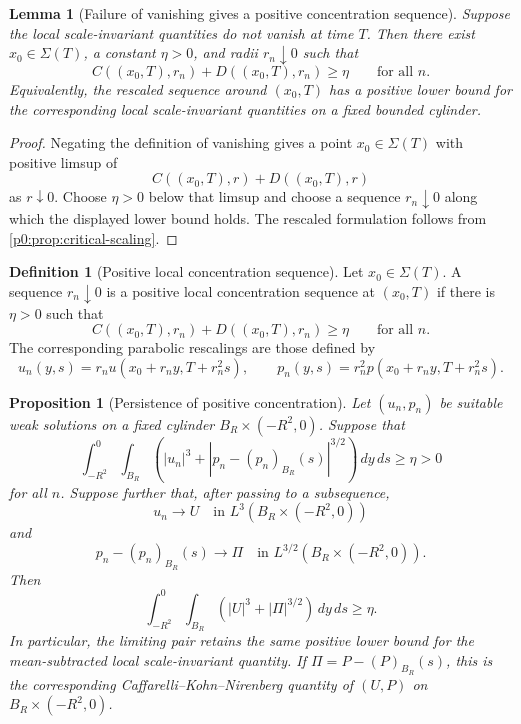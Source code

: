\documentclass[11pt]{amsart}
\theoremstyle{plain}
\newtheorem{lemma}[lemma]{Lemma}
\newtheorem{proposition}[proposition]{Proposition}
\theoremstyle{definition}
\newtheorem{definition}[definition]{Definition}
\theoremstyle{remark}
\numberwithin{equation}{section}
\begin{document}
\begin{lemma}[Failure of vanishing gives a positive concentration sequence]
\label{p0:lem:positive-concentration}
Suppose the local scale-invariant quantities do not vanish at time \(T\).  Then
there exist \(x_0\in\Sigma(T)\), a constant \(\eta>0\), and radii
\(r_n\downarrow0\) such that
\[
  C((x_0,T),r_n)+D((x_0,T),r_n)\ge\eta
  \qquad\text{for all }n.
\]
Equivalently, the rescaled sequence around \((x_0,T)\) has a positive lower
bound for the corresponding local scale-invariant quantities on a fixed
bounded cylinder.
\end{lemma}

\begin{proof}
Negating the definition of vanishing gives a point \(x_0\in\Sigma(T)\) with
positive limsup of
\[
  C((x_0,T),r)+D((x_0,T),r)
\]
as \(r\downarrow0\).  Choose \(\eta>0\) below that limsup and choose a sequence
\(r_n\downarrow0\) along which the displayed lower bound holds.  The rescaled
formulation follows from \cref{p0:prop:critical-scaling}.
\end{proof}

\begin{definition}[Positive local concentration sequence]
\label{p0:def:positive-concentration-sequence}
Let \(x_0\in\Sigma(T)\).  A sequence \(r_n\downarrow0\) is a positive local
concentration sequence at \((x_0,T)\) if there is \(\eta>0\) such that
\[
  C((x_0,T),r_n)+D((x_0,T),r_n)\ge\eta
  \qquad\text{for all }n.
\]
The corresponding parabolic rescalings are those defined by
\[
  u_n(y,s)=r_nu(x_0+r_ny,T+r_n^2s),
  \qquad
  p_n(y,s)=r_n^2p(x_0+r_ny,T+r_n^2s).
\]
\end{definition}

\begin{proposition}[Persistence of positive concentration]
\label{p0:prop:compactness-persistence}
Let \((u_n,p_n)\) be suitable weak solutions on a fixed cylinder
\(B_R\times(-R^2,0)\).  Suppose that
\[
  \int_{-R^2}^{0}\int_{B_R}
  \left(|u_n|^3+|p_n-(p_n)_{B_R}(s)|^{3/2}\right)\,dy\,ds
  \ge\eta>0
\]
for all \(n\).  Suppose further that, after passing to a subsequence,
\[
  u_n\to U\quad\text{in }L^3(B_R\times(-R^2,0))
\]
and
\[
  p_n-(p_n)_{B_R}(s)\to \Pi
  \quad\text{in }L^{3/2}(B_R\times(-R^2,0)).
\]
Then
\[
  \int_{-R^2}^{0}\int_{B_R}
  \left(|U|^3+|\Pi|^{3/2}\right)\,dy\,ds\ge\eta.
\]
In particular, the limiting pair retains the same positive lower bound for the
mean-subtracted local scale-invariant quantity.  If
\(\Pi=P-(P)_{B_R}(s)\), this is the corresponding
Caffarelli--Kohn--Nirenberg quantity of \((U,P)\) on
\(B_R\times(-R^2,0)\).
\end{proposition}
\end{document}
